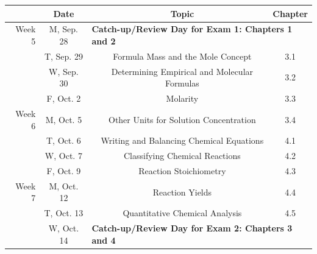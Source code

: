 \documentclass[12pt, letterpaper]{article}
\begin{document}
\noindent
\begin{tabular}{rcccc}
	        & Date       &                                                                               & Topic                                                   & Chapter \\
	\midrule
	Week 5  & M, Sep. 28 & \multicolumn{3}{l}{\textbf{Catch-up/Review Day for Exam 1: Chapters 1 and 2}}                                                                     \\
	        & T, Sep. 29 &                                                                               & Formula Mass and the Mole Concept                       & 3.1     \\
	        & W, Sep. 30 &                                                                               & Determining Empirical and Molecular Formulas            & 3.2     \\
	        & F, Oct. 2  &                                                                               & Molarity                                                & 3.3     \\
	\midrule
	Week 6  & M, Oct. 5  &                                                                               & Other Units for Solution Concentration                  & 3.4     \\
	        & T, Oct. 6  &                                                                               & Writing and Balancing Chemical Equations                & 4.1     \\
	        & W, Oct. 7  &                                                                               & Classifying Chemical Reactions                          & 4.2     \\
	        & F, Oct. 9  &                                                                               & Reaction Stoichiometry                                  & 4.3     \\
	\midrule
	Week 7  & M, Oct. 12 &                                                                               & Reaction Yields                                         & 4.4     \\
	        & T, Oct. 13 &                                                                               & Quantitative Chemical Analysis                          & 4.5     \\
	        & W, Oct. 14 & \multicolumn{3}{l}{\textbf{Catch-up/Review Day for Exam 2: Chapters 3 and 4}}                                                                     \\

\end{tabular}
\end{document}
